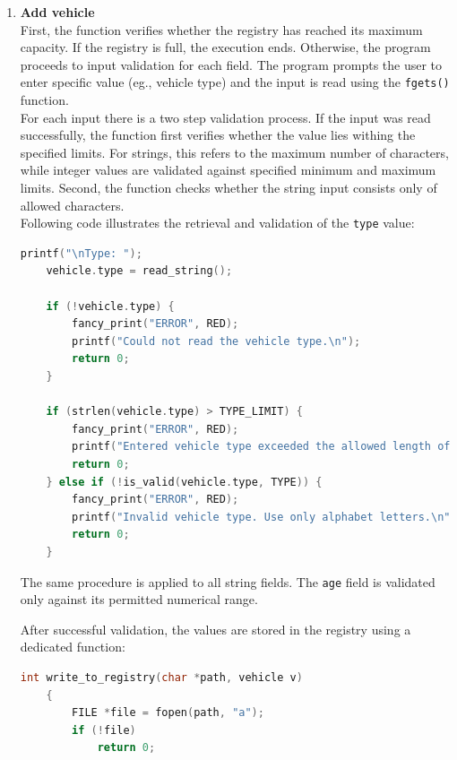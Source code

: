 \documentclass[12pt, a4paper]{article}
\begin{document}
\begin{enumerate}
  \item \textbf{Add vehicle} \\

  First, the function verifies whether the registry has reached its maximum capacity. If the registry is full, the execution ends. 
  Otherwise, the program proceeds to input validation for each field.
  The program prompts the user to enter specific value (eg., vehicle type) and the input is read using the \texttt{fgets()} function. \\

  For each input there is a two step validation process. If the input was read successfully, the function first verifies whether the value lies withing the specified limits.
  For strings, this refers to the maximum number of characters, while integer values are validated against specified minimum and maximum limits.
  Second, the function checks whether the string input consists only of allowed characters. \\

  Following code illustrates the retrieval and validation of the \texttt{type} value:

        \begin{lstlisting}[language=C, caption={Retrieving and validating vehicle data}]
    printf("\nType: ");
    vehicle.type = read_string();

    if (!vehicle.type) {
        fancy_print("ERROR", RED);
        printf("Could not read the vehicle type.\n");
        return 0;
    }

    if (strlen(vehicle.type) > TYPE_LIMIT) {
        fancy_print("ERROR", RED);
        printf("Entered vehicle type exceeded the allowed length of %d characters.\n", TYPE_LIMIT);
        return 0;
    } else if (!is_valid(vehicle.type, TYPE)) {
        fancy_print("ERROR", RED);
        printf("Invalid vehicle type. Use only alphabet letters.\n");
        return 0;
    }
    \end{lstlisting}
  
  The same procedure is applied to all string fields. The \texttt{age} field is validated only against its permitted numerical range.

  After successful validation, the values are stored in the registry using a dedicated function:

    \begin{lstlisting}[language=C, caption={Writing to the registry}]
    int write_to_registry(char *path, vehicle v)
    {
        FILE *file = fopen(path, "a");
        if (!file)
            return 0;
    

\end{lstlisting}
\end{enumerate}
\end{document}
